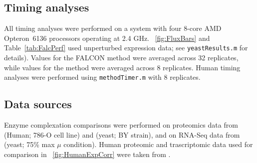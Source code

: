 \subsection{Timing analyses}
All timing analyses were performed on a system with four 8-core AMD
Opteron\texttrademark\ 6136 processors operating at 2.4 GHz. 
\Fig~\ref{fig:FluxBars} and Table~\ref{tab:FalcPerf} used unperturbed
expression data; see
\texttt{yeastResults.m} for details). Values for the FALCON method
were averaged across 32 replicates, while values for the
\citealt{Lee2012} method were averaged across 8 replicates. Human
timing analyses were performed using \texttt{methodTimer.m} with
8 replicates.

\subsection{Data sources}
Enzyme complexation comparisons were performed on proteomics data
from \citealt{Gholami2013} (Human; 786-O cell line) and 
\citealt{Picotti2013} (yeast; BY strain), and on RNA-Seq data
from \citealt{Lee2012} (yeast; 75\% max $\mu$ condition).
Human proteomic and trascriptomic data used for comparison
in \suppOrApp \Fig~\ref{fig:HumanExpCorr} were taken from 
\citealt{Gholami2013}.